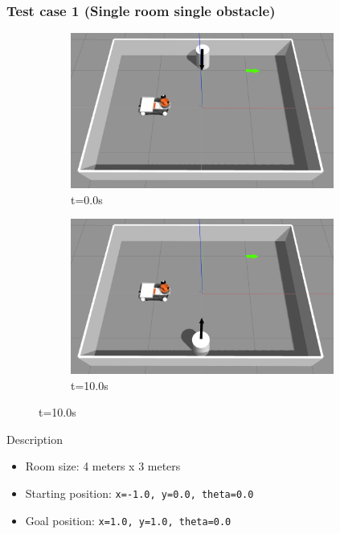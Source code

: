 \documentclass{beamer}
\begin{document}
\begin{frame}
    \frametitle{\huge{Test case 1} (Single room single obstacle)}
    \begin{figure}[ht]
        \centering
        \begin{subfigure}[b]{0.50\linewidth}
            \centering
            \includegraphics[width=0.95\textwidth]{../report/images/test_case_1/exp1.png}
            \caption{t=0.0s}
        \end{subfigure}%
        \begin{subfigure}[b]{0.50\linewidth}
            \centering
            \includegraphics[width=0.95\textwidth]{../report/images/test_case_1/exp3.png}
            \caption{t=10.0s}
        \end{subfigure}%
    \end{figure}
    \begin{block}{Description}
        \begin{itemize}
            \item Room size: 4 meters x 3 meters
            \item Starting position: \texttt{x=-1.0, y=0.0, theta=0.0} 
            \item Goal position: \texttt{x=1.0, y=1.0, theta=0.0}
        \end{itemize}
    \end{block}
\end{frame}
\end{document}
